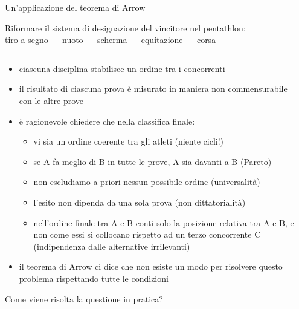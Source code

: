 \documentclass[aspectratio=64,12pt]{beamer}
\begin{document}
\begin{frame}{Un'applicazione del teorema di Arrow}
\begin{resize}{.9}
Riformare il sistema di designazione del vincitore nel \alert{pentathlon}: \\[0pt]
tiro a segno --- nuoto --- scherma --- equitazione --- corsa
\begin{columns}
\begin{column}{.8\columnwidth}
\begin{itemize}
\item ciascuna disciplina stabilisce un ordine tra i concorrenti
\item il risultato di ciascuna prova è misurato in maniera non commensurabile con
le altre prove
\item è ragionevole chiedere che nella classifica finale:
\begin{itemize}
\item vi sia un ordine coerente tra gli atleti (niente cicli!)
\item se A fa meglio di B in tutte le prove, A sia davanti a B (Pareto)
\item non escludiamo a priori nessun possibile ordine (universalità)
\item l'esito non dipenda da una sola prova (non dittatorialità)
\item nell'ordine finale tra A e B conti solo la posizione relativa tra A
e B, e non come essi si collocano rispetto ad un terzo concorrente C
(indipendenza dalle alternative irrilevanti)
\end{itemize}
\item il teorema di Arrow ci dice che non esiste un modo per risolvere questo
problema rispettando tutte le condizioni
\end{itemize}
Come viene risolta la questione in pratica?
\end{column}
\begin{column}{.2\columnwidth}
\begin{center}

\end{center}
\end{column}
\end{columns}
\end{resize}
\end{frame}
\end{document}
